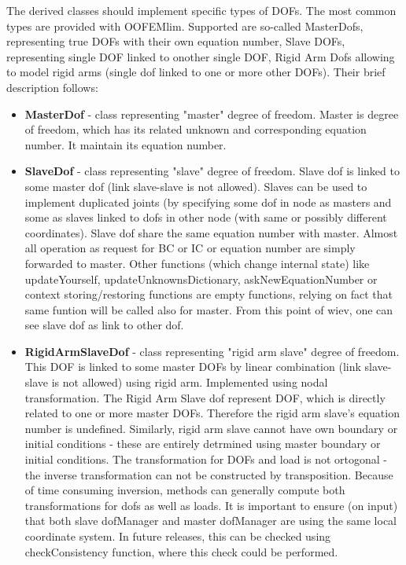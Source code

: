 \documentclass[a4paper]{article}
\newcommand{\class}[1]{{\bf #1}}
\begin{document}
The derived classes should implement specific types of DOFs. The
most common types are provided with OOFEMlim. Supported are so-called
MasterDofs, representing true DOFs with their own equation number,
Slave DOFs, representing single DOF linked to onother single DOF, Rigid Arm Dofs
allowing to model rigid arms (single dof linked to one or more other DOFs).
Their brief description follows:
\begin{itemize}
\item
\class{MasterDof} - class representing "master" degree of freedom. 
Master is degree of freedom, which has its related unknown and
    corresponding equation number. It maintain its equation number.
\item
\class{SlaveDof} - class representing "slave" degree of freedom. 
Slave dof is linked to some master dof (link slave-slave is not
allowed). Slaves can be used to implement duplicated joints (by
specifying some dof in node as masters and some as slaves linked to
dofs in other node (with same or possibly different
coordinates). Slave dof share the same equation number with
master. Almost all operation as request for BC or IC or equation
number are simply forwarded to master. Other functions (which change
internal state) like updateYourself, updateUnknownsDictionary,
askNewEquationNumber or context storing/restoring functions are empty
functions, relying on fact that same funtion will be called also for
master. From this point of wiev, one can see slave dof as link to
other dof.
\item
\class{RigidArmSlaveDof} - class representing "rigid arm slave" degree
of freedom. This DOF is linked to some master DOFs by linear
combination (link slave-slave is
not allowed) using rigid arm. Implemented using nodal
transformation. The Rigid Arm Slave dof represent DOF, which is
directly related to one or more master DOFs. Therefore the rigid arm slave's
equation number is undefined. Similarly, rigid arm slave cannot have
own boundary or initial conditions - these are entirely detrmined
using master boundary or initial conditions.
The transformation for DOFs and load is not ortogonal - the inverse
transformation can not be constructed by transposition. Because of
time consuming inversion, methods can generally compute both
transformations for dofs as well as loads. It is important to ensure
(on input) that both slave dofManager and master dofManager are using
the same local coordinate system. In future releases, this can be
checked using checkConsistency function, where this check could be
performed. 
\end{itemize}
\end{document}
